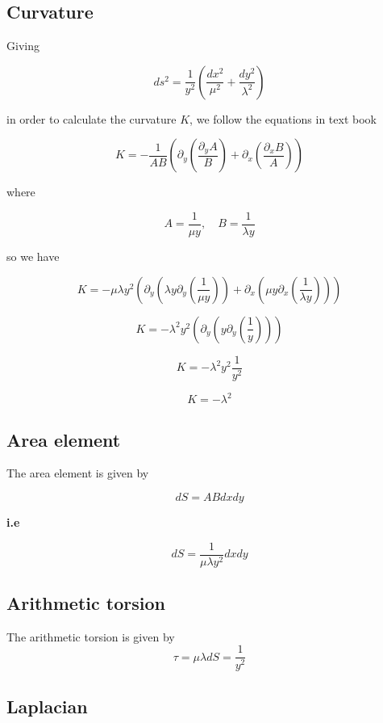 
\subsection{Curvature}\label{sec:curvature-calculations}

Giving

\[
    ds^2 = \frac{1}{y^2} (\frac{dx^2}{\mu^2} + \frac{dy^2}{\lambda^2})
\]

in order to calculate the curvature $K$, we follow the equations in text book

\[
    K = - \frac{1}{A B} \left(\partial_y \left(\frac{\partial_y A}{B}\right) + \partial_x \left(\frac{\partial_x B}{A}\right)\right)
\]

where

\[
    A = \frac{1}{\mu y}, \quad B = \frac{1}{\lambda y}
\]

so we have

\[
    K = - \mu \lambda y^2 \left(
          \partial_y \left(\lambda y \partial_y \left(\frac{1}{\mu y}\right)\right)
        + \partial_x \left(\mu y \partial_x \left(\frac{1}{\lambda y}\right)\right)
    \right)
\]

\[
    K = - \lambda^2 y^2 \left(
    \partial_y \left( y \partial_y \left(\frac{1}{y} \right)\right)
    \right)
\]

\[
    K = - \lambda^2 y^2 \frac{1}{y^2}
\]

\[
    K = - \lambda^2
\]

\subsection{Area element}\label{sec:area-element}

The area element is given by

\[
    dS = A B dx dy
\]

\textbf{i.e}

\[
    dS = \frac{1}{\mu \lambda y^2} dx dy
\]

\subsection{Arithmetic torsion}\label{sec:torsion-calculations}

The arithmetic torsion is given by
\[
    \tau = \mu \lambda dS = \frac{1}{y^2}
\]

\subsection{Laplacian}\label{sec:laplacian-calculations}

\newpage
